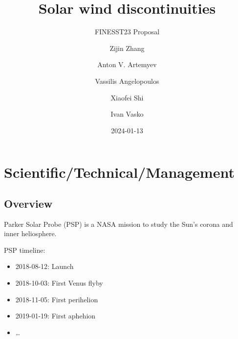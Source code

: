 \documentclass[
  letterpaper,
  DIV=11,
  numbers=noendperiod,
  oneside]{scrartcl}
\title{Solar wind discontinuities}
\subtitle{FINESST23 Proposal}
\author{Zijin Zhang \and Anton V. Artemyev \and Vassilis
Angelopoulos \and Xiaofei Shi \and Ivan Vasko}
\date{2024-01-13}
\providecommand{\tightlist}{%
  \setlength{\itemsep}{0pt}\setlength{\parskip}{0pt}}\usepackage{longtable,booktabs,array}
\begin{document}
\maketitle

\section{Scientific/Technical/Management}\label{scientifictechnicalmanagement}

\subsection{Overview}\label{overview}

Parker Solar Probe (PSP) is a NASA mission to study the Sun's corona and
inner heliosphere.

PSP timeline:

\begin{itemize}
\tightlist
\item
  2018-08-12: Launch
\item
  2018-10-03: First Venus flyby
\item
  2018-11-05: First perihelion
\item
  2019-01-19: First aphehion
\item
  \ldots{}
\end{itemize}
\end{document}
